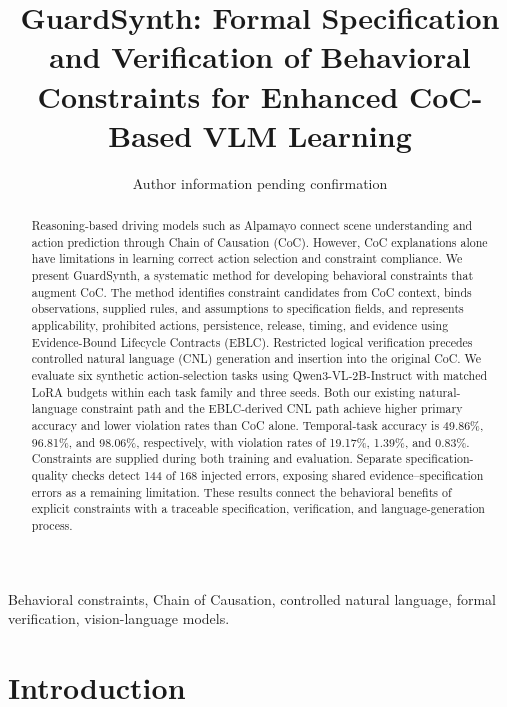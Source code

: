 \documentclass[nolineno]{ieeeaccess}
\begin{document}
\pagestyle{headings}
\doi{}
\title{GuardSynth: Formal Specification and Verification of Behavioral Constraints for Enhanced CoC-Based VLM Learning}
\author{Author information pending confirmation}
\address{Affiliations and corresponding author to be confirmed}
\begin{abstract}Reasoning-based driving models such as Alpamayo connect scene understanding and action prediction through Chain of Causation (CoC). However, CoC explanations alone have limitations in learning correct action selection and constraint compliance. We present GuardSynth, a systematic method for developing behavioral constraints that augment CoC. The method identifies constraint candidates from CoC context, binds observations, supplied rules, and assumptions to specification fields, and represents applicability, prohibited actions, persistence, release, timing, and evidence using Evidence-Bound Lifecycle Contracts (EBLC). Restricted logical verification precedes controlled natural language (CNL) generation and insertion into the original CoC. We evaluate six synthetic action-selection tasks using Qwen3-VL-2B-Instruct with matched LoRA budgets within each task family and three seeds. Both our existing natural-language constraint path and the EBLC-derived CNL path achieve higher primary accuracy and lower violation rates than CoC alone. Temporal-task accuracy is 49.86\%, 96.81\%, and 98.06\%, respectively, with violation rates of 19.17\%, 1.39\%, and 0.83\%. Constraints are supplied during both training and evaluation. Separate specification-quality checks detect 144 of 168 injected errors, exposing shared evidence--specification errors as a remaining limitation. These results connect the behavioral benefits of explicit constraints with a traceable specification, verification, and language-generation process.\end{abstract}
\begin{keywords}Behavioral constraints, Chain of Causation, controlled natural language, formal verification, vision-language models.\end{keywords}
\maketitle

\section{Introduction}
\end{document}
